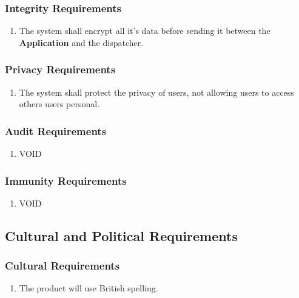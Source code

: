 \documentclass[english]{article}
\begin{document}
\subsubsection{Integrity Requirements}
\label{ssub:integrity_requirements}
\begin{enumerate}[{SIR}1. ]
	\item The system shall encrypt all it's data before sending it between the \textbf{Application} and the dispatcher. 
\end{enumerate}

\subsubsection{Privacy Requirements}
\label{ssub:privacy_requirements}
\begin{enumerate}[{SPR}1. ]
	\item The system shall protect the privacy of users, not allowing users to access others users personal.
\end{enumerate}

\subsubsection{Audit Requirements}
\label{ssub:audit_requirements}
\begin{enumerate}[{SAUR}1. ]
	\item VOID
\end{enumerate}

\subsubsection{Immunity Requirements}
\label{ssub:immunity_requirements}
\begin{enumerate}[{SIMR}1. ]
	\item VOID
\end{enumerate}


\subsection{Cultural and Political Requirements}
\label{sub:cultural_and_political_requirements}

\subsubsection{Cultural Requirements}
\label{ssub:cultural_requirements}
\begin{enumerate}[{CCR}1. ]
	\item The product will use British spelling.
\end{enumerate}
\end{document}
